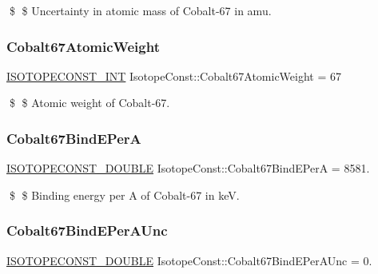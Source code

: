 \$ \$ Uncertainty in atomic mass of Cobalt-\/67 in amu. \mbox{\label{group___isotope_const-_cobalt-_co67_ga9d07517df4c70b7ab0ec004acf390ea6}} 
\subsubsection{\texorpdfstring{Cobalt67\+Atomic\+Weight}{Cobalt67AtomicWeight}}
{\footnotesize\ttfamily \mbox{\hyperlink{group___isotope_const-_macros_ga5f18360b3e99483a35c32d789e62621c}{I\+S\+O\+T\+O\+P\+E\+C\+O\+N\+S\+T\+\_\+\+I\+NT}} Isotope\+Const\+::\+Cobalt67\+Atomic\+Weight = 67}

\$ \$ Atomic weight of Cobalt-\/67. \mbox{\label{group___isotope_const-_cobalt-_co67_ga719d2329c9af3155c8d6ade3d627054b}} 
\subsubsection{\texorpdfstring{Cobalt67\+Bind\+E\+PerA}{Cobalt67BindEPerA}}
{\footnotesize\ttfamily \mbox{\hyperlink{group___isotope_const-_macros_ga8f45a7272ce02c0b4c65c44636ed719a}{I\+S\+O\+T\+O\+P\+E\+C\+O\+N\+S\+T\+\_\+\+D\+O\+U\+B\+LE}} Isotope\+Const\+::\+Cobalt67\+Bind\+E\+PerA = 8581.}

\$ \$ Binding energy per A of Cobalt-\/67 in keV. \mbox{\label{group___isotope_const-_cobalt-_co67_ga2b58c61d27f46f1f9f46d20b5d29c946}} 
\subsubsection{\texorpdfstring{Cobalt67\+Bind\+E\+Per\+A\+Unc}{Cobalt67BindEPerAUnc}}
{\footnotesize\ttfamily \mbox{\hyperlink{group___isotope_const-_macros_ga8f45a7272ce02c0b4c65c44636ed719a}{I\+S\+O\+T\+O\+P\+E\+C\+O\+N\+S\+T\+\_\+\+D\+O\+U\+B\+LE}} Isotope\+Const\+::\+Cobalt67\+Bind\+E\+Per\+A\+Unc = 0.}

